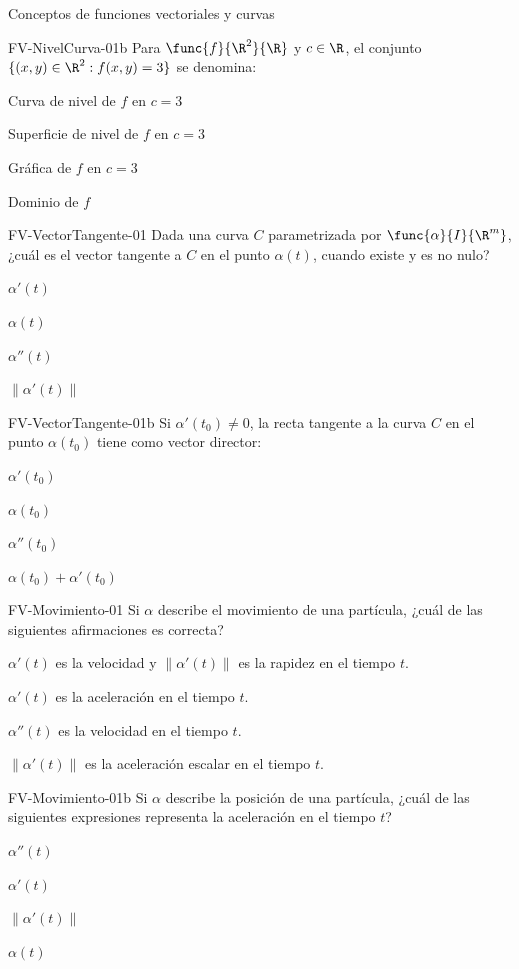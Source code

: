 \documentclass[a4,11pt]{aleph-notas}
\begin{document}
\begin{quiz}{Conceptos de funciones vectoriales y curvas}
\begin{multi}[]%
    {FV-NivelCurva-01b}
    Para $\func{f}{\R^2}{\R}$ y $c\in\R$, el conjunto $\{(x,y)\in\R^2 : f(x,y)=3\}$ se denomina:
    \item* Curva de nivel de $f$ en $c=3$
    \item Superficie de nivel de $f$ en $c=3$
    \item Gráfica de $f$ en $c=3$
    \item Dominio de $f$
\end{multi}

\begin{multi}[]%
    {FV-VectorTangente-01}
    Dada una curva $C$ parametrizada por $\func{\alpha}{I}{\R^m}$, ¿cuál es el vector tangente a $C$ en el punto $\alpha(t)$, cuando existe y es no nulo?
    \item* $\alpha'(t)$
    \item $\alpha(t)$
    \item $\alpha''(t)$
    \item $\|\alpha'(t)\|$
\end{multi}

\begin{multi}[]%
    {FV-VectorTangente-01b}
    Si $\alpha'(t_0)\neq 0$, la recta tangente a la curva $C$ en el punto $\alpha(t_0)$ tiene como vector director:
    \item* $\alpha'(t_0)$
    \item $\alpha(t_0)$
    \item $\alpha''(t_0)$
    \item $\alpha(t_0)+\alpha'(t_0)$
\end{multi}

\begin{multi}[]%
    {FV-Movimiento-01}
    Si $\alpha$ describe el movimiento de una partícula, ¿cuál de las siguientes afirmaciones es correcta?
    \item* $\alpha'(t)$ es la velocidad y $\|\alpha'(t)\|$ es la rapidez en el tiempo $t$.
    \item $\alpha'(t)$ es la aceleración en el tiempo $t$.
    \item $\alpha''(t)$ es la velocidad en el tiempo $t$.
    \item $\|\alpha'(t)\|$ es la aceleración escalar en el tiempo $t$.
\end{multi}

\begin{multi}[]%
    {FV-Movimiento-01b}
    Si $\alpha$ describe la posición de una partícula, ¿cuál de las siguientes expresiones representa la aceleración en el tiempo $t$?
    \item* $\alpha''(t)$
    \item $\alpha'(t)$
    \item $\|\alpha'(t)\|$
    \item $\alpha(t)$
\end{multi}


\end{quiz}
\end{document}
